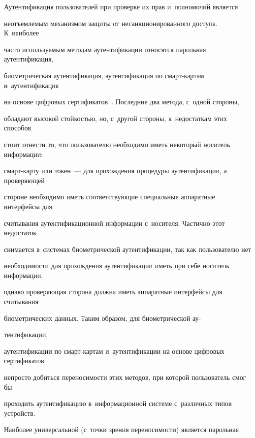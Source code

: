 Аутентификация пользователей при проверке их прав и~полномочий является 


неотъемлемым механизмом защиты от несанкционированного доступа. К~наиболее 


часто используемым методам аутентификации относятся парольная аутентификация, 


биометрическая аутентификация, аутентификация по смарт-кар\-там и~аутентификация 


на основе цифровых сертификатов~\cite{Lal2016}. Последние два метода, с~одной стороны, 


обладают высокой стойкостью, но, с~другой стороны, к~недостаткам этих способов 


стоит отнести то, что пользователю необходимо иметь некоторый носитель информации: 


смарт-кар\-ту или токен~--- для про\-хож\-де\-ния процедуры аутентификации, а проверяющей 


стороне необходимо иметь соответствующие специальные аппаратные интерфейсы для 


считывания аутентификационной информации с~носителя. Частично этот недостаток 


снимается в~системах биометрической аутентификации, так как пользователю нет 


необходимости для прохождения аутентификации иметь при себе носитель информации, 


однако проверяющая сторона должна иметь аппаратные интерфейсы для считывания 


биометрических данных. Таким образом, для биометрической ау-\linebreak\vspace*{-12pt}





\pagebreak





\noindent


тентификации, 


аутентификации по смарт-кар\-там и~аутентификации на основе цифровых сертификатов 


непросто добиться переносимости этих методов, при которой пользователь смог бы 


проходить аутентификацию в~информационной системе с~различных типов устройств. 


Наиболее универсальной (с~точки зрения переносимости) является парольная 


